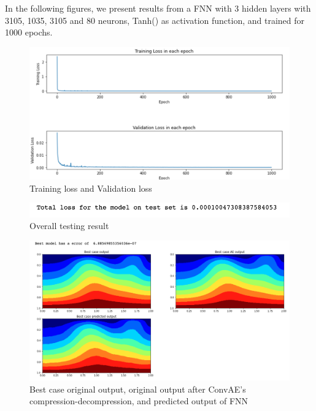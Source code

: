 In the following figures, we present results from a FNN with 3 hidden layers with 3105, 1035, 3105 and 80 neurons, Tanh() as activation function, and trained for 1000 epochs.

\begin{figure}[H]
    \caption{Training loss and Validation loss}
    \includegraphics[scale=0.6]{figures/mantle_convection_images/limited_dataset/FNN_trainingData.png}
\end{figure}

\begin{figure}[H]
    \caption{Overall testing result}
    \includegraphics[scale=0.8]{figures/mantle_convection_images/limited_dataset/FNN_OverallTesting.png}
\end{figure}

\begin{figure}[H]
    \caption{Best case original output, original output after ConvAE's compression-decompression, and predicted output of FNN}
    \includegraphics[scale=0.5]{figures/mantle_convection_images/limited_dataset/FNN_Best.png}
\end{figure}

